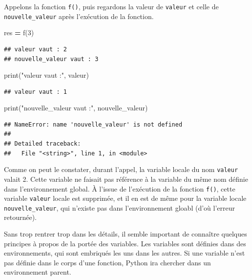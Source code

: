 \documentclass[12pt,]{book}
\newenvironment{Shaded}{\begin{snugshade}}{\end{snugshade}}
\newcommand{\DecValTok}[1]{\textcolor[rgb]{0.00,0.00,0.81}{#1}}
\newcommand{\StringTok}[1]{\textcolor[rgb]{0.31,0.60,0.02}{#1}}
\newcommand{\OperatorTok}[1]{\textcolor[rgb]{0.81,0.36,0.00}{\textbf{#1}}}
\newcommand{\BuiltInTok}[1]{#1}
\newcommand{\NormalTok}[1]{#1}
\numberwithin{equation}{section}
\numberwithin{countremarque}{section}
\begin{document}
Appelons la fonction \texttt{f()}, puis regardons la valeur de
\texttt{valeur} et celle de \texttt{nouvelle\_valeur} après l'exécution
de la fonction.

\begin{Shaded}
\begin{Highlighting}[]
\NormalTok{res }\OperatorTok{=}\NormalTok{ f(}\DecValTok{3}\NormalTok{)}
\end{Highlighting}
\end{Shaded}

\begin{lstlisting}
## valeur vaut : 2
## nouvelle_valeur vaut : 3
\end{lstlisting}

\begin{Shaded}
\begin{Highlighting}[]
\BuiltInTok{print}\NormalTok{(}\StringTok{"valeur vaut :"}\NormalTok{, valeur)}
\end{Highlighting}
\end{Shaded}

\begin{lstlisting}
## valeur vaut : 1
\end{lstlisting}

\begin{Shaded}
\begin{Highlighting}[]
\BuiltInTok{print}\NormalTok{(}\StringTok{"nouvelle_valeur vaut :"}\NormalTok{, nouvelle_valeur)}
\end{Highlighting}
\end{Shaded}

\begin{lstlisting}
## NameError: name 'nouvelle_valeur' is not defined
## 
## Detailed traceback: 
##   File "<string>", line 1, in <module>
\end{lstlisting}

Comme on peut le constater, durant l'appel, la variable locale du nom
\texttt{valeur} valait 2. Cette variable ne faisait pas référence à la
variable du même nom définie dans l'environnement global. À l'issue de
l'exécution de la fonction \texttt{f()}, cette variable \texttt{valeur}
locale est supprimée, et il en est de même pour la variable locale
\texttt{nouvelle\_valeur}, qui n'existe pas dans l'environnement gloabl
(d'où l'erreur retournée).

Sans trop rentrer trop dans les détails, il semble important de
connaître quelques principes à propos de la portée des variables. Les
variables sont définies dans des environnements, qui sont embriqués les
uns dans les autres. Si une variable n'est pas définie dans le corps
d'une fonction, Python ira chercher dans un environnement parent.
\end{document}
